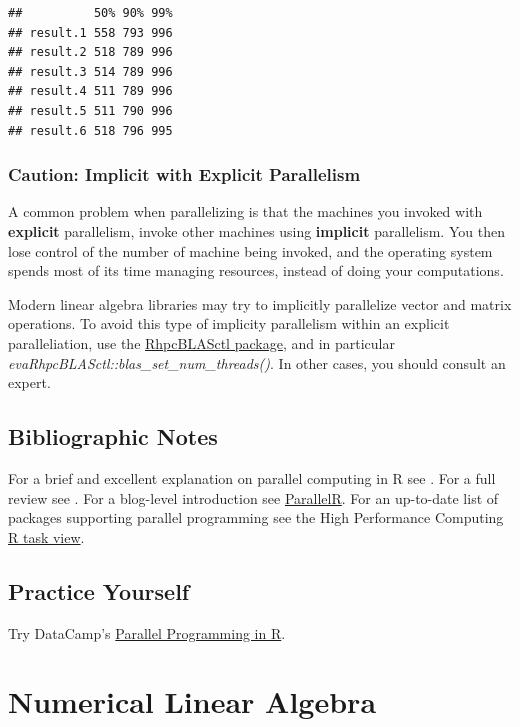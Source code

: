 \documentclass[]{book}
\theoremstyle{definition}
\theoremstyle{definition}
\theoremstyle{definition}
\theoremstyle{remark}
\begin{document}
\begin{verbatim}
##          50% 90% 99%
## result.1 558 793 996
## result.2 518 789 996
## result.3 514 789 996
## result.4 511 789 996
## result.5 511 790 996
## result.6 518 796 995
\end{verbatim}

\subsection{Caution: Implicit with Explicit
Parallelism}\label{caution-implicit-with-explicit-parallelism}

A common problem when parallelizing is that the machines you invoked
with \textbf{explicit} parallelism, invoke other machines using
\textbf{implicit} parallelism. You then lose control of the number of
machine being invoked, and the operating system spends most of its time
managing resources, instead of doing your computations.

Modern linear algebra libraries may try to implicitly parallelize vector
and matrix operations. To avoid this type of implicity parallelism
within an explicit paralleliation, use the \href{}{RhpcBLASctl package},
and in particular \emph{evaRhpcBLASctl::blas\_set\_num\_threads()}. In
other cases, you should consult an expert.

\section{Bibliographic Notes}\label{bibliographic-notes-14}

For a brief and excellent explanation on parallel computing in R see
\citet{schmidberger2009state}. For a full review see
\citet{chapple2016mastering}. For a blog-level introduction see
\href{http://www.parallelr.com/r-with-parallel-computing/}{ParallelR}.
For an up-to-date list of packages supporting parallel programming see
the High Performance Computing
\href{https://cran.r-project.org/web/views/HighPerformanceComputing.html}{R
task view}.

\section{Practice Yourself}\label{practice-yourself-12}

Try DataCamp's
\href{https://www.datacamp.com/courses/parallel-programming-in-r}{Parallel
Programming in R}.

\chapter{Numerical Linear Algebra}\label{algebra}
\end{document}
